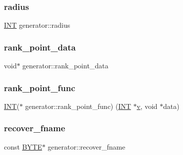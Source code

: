 \mbox{\label{classgenerator_a07e80328654a6420b5fea240fdeac8fc}} 
\subsubsection{\texorpdfstring{radius}{radius}}
{\footnotesize\ttfamily \mbox{\hyperlink{galois_8h_a09fddde158a3a20bd2dcadb609de11dc}{I\+NT}} generator\+::radius}

\mbox{\label{classgenerator_ae7cf44cef700778c00308b0da5f37a07}} 
\subsubsection{\texorpdfstring{rank\+\_\+point\+\_\+data}{rank\_point\_data}}
{\footnotesize\ttfamily void$\ast$ generator\+::rank\+\_\+point\+\_\+data}

\mbox{\label{classgenerator_ada3f355c2b0c7b657b4bd2bda877a121}} 
\subsubsection{\texorpdfstring{rank\+\_\+point\+\_\+func}{rank\_point\_func}}
{\footnotesize\ttfamily \mbox{\hyperlink{galois_8h_a09fddde158a3a20bd2dcadb609de11dc}{I\+NT}}($\ast$ generator\+::rank\+\_\+point\+\_\+func) (\mbox{\hyperlink{galois_8h_a09fddde158a3a20bd2dcadb609de11dc}{I\+NT}} $\ast$\mbox{\hyperlink{simeon_8_c_aeb3f3030944801b163bc3b829a7f6710}{v}}, void $\ast$data)}

\mbox{\label{classgenerator_a37fd12bebf49ec26149c66f244362230}} 
\subsubsection{\texorpdfstring{recover\+\_\+fname}{recover\_fname}}
{\footnotesize\ttfamily const \mbox{\hyperlink{galois_8h_ab6cc7b4aeb6ea31aba2b3fbfc83ff5e6}{B\+Y\+TE}}$\ast$ generator\+::recover\+\_\+fname}

